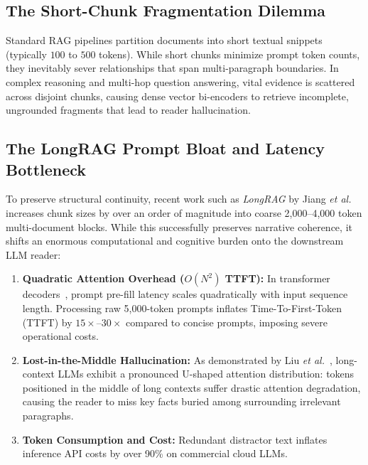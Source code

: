 \documentclass[10pt,journal,compsoc]{IEEEtran}
\begin{document}
\subsection{The Short-Chunk Fragmentation Dilemma}
Standard RAG pipelines partition documents into short textual snippets (typically $100$ to $500$ tokens). While short chunks minimize prompt token counts, they inevitably sever relationships that span multi-paragraph boundaries. In complex reasoning and multi-hop question answering, vital evidence is scattered across disjoint chunks, causing dense vector bi-encoders to retrieve incomplete, ungrounded fragments that lead to reader hallucination.

\subsection{The LongRAG Prompt Bloat and Latency Bottleneck}
To preserve structural continuity, recent work such as \textit{LongRAG} by Jiang \textit{et al.}~\cite{longrag} increases chunk sizes by over an order of magnitude into coarse 2,000--4,000 token multi-document blocks. While this successfully preserves narrative coherence, it shifts an enormous computational and cognitive burden onto the downstream LLM reader:
\begin{enumerate}
    \item \textbf{Quadratic Attention Overhead ($O(N^2)$ TTFT):} In transformer decoders~\cite{attention}, prompt pre-fill latency scales quadratically with input sequence length. Processing raw 5,000-token prompts inflates Time-To-First-Token (TTFT) by $15\times$--$30\times$ compared to concise prompts, imposing severe operational costs.
    \item \textbf{Lost-in-the-Middle Hallucination:} As demonstrated by Liu \textit{et al.}~\cite{lostinmiddle}, long-context LLMs exhibit a pronounced U-shaped attention distribution: tokens positioned in the middle of long contexts suffer drastic attention degradation, causing the reader to miss key facts buried among surrounding irrelevant paragraphs.
    \item \textbf{Token Consumption and Cost:} Redundant distractor text inflates inference API costs by over 90\% on commercial cloud LLMs.
\end{enumerate}
\end{document}
